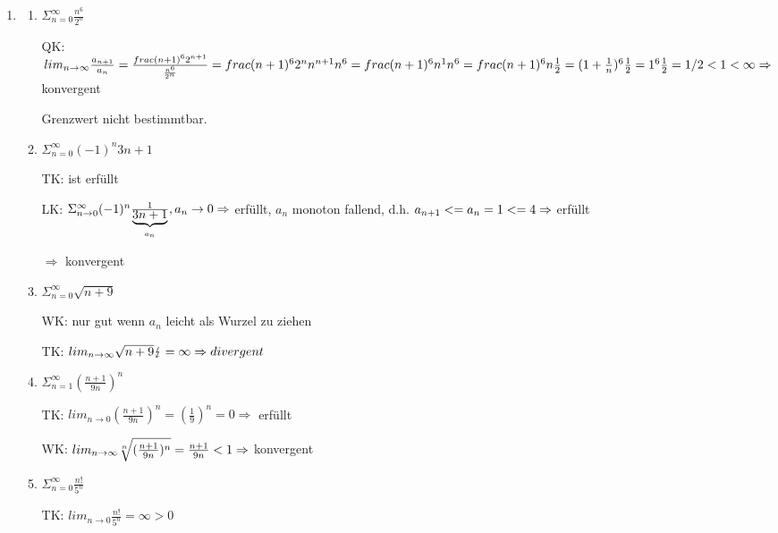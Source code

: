 \documentclass[12pt,a4paper]{scrreprt}
\begin{document}
\begin{enumerate}
\item 
\begin{enumerate}
\item $\Sigma_{n=0}^{\infty} \frac{n^6}{2^n}$

QK: $lim_{n \rightarrow \infty} \frac{a_{n+1}}{a_n} \\
= \frac{ frac{(n+1)^6}{2^{n+1}} }{ \frac{n^6}{2^n} } \\
= frac{ (n+1)^6 2^n }{ n^{n+1} n^6 } \\
= frac{ (n+1)^6 }{ n^{1} n^6 } \\
= frac{(n+1)^6}{n} \frac{1}{2} \\
= (1 + \frac{1}{n})^6 \frac{1}{2} \\
= 1^6 \frac{1}{2} = 1/2 < 1 < \infty \Rightarrow$ konvergent

Grenzwert nicht bestimmtbar.

\item $\Sigma_{n=0}^{\infty} {(-1)^n}{3n+1}$

TK: ist erfüllt

LK: $\Sigma_{n \rightarrow 0}^{\infty} (-1)^n \frac{1}{\underbrace{3n+1}_{a_n}} , a_n \\
\rightarrow 0 \Rightarrow$ erfüllt, $a_n$ monoton fallend, d.h. $a_{n+1} <= a_n = 1 <= 4 \\
\Rightarrow $ erfüllt

$\Rightarrow$ konvergent

\item $\Sigma_{n=0}^{\infty} \sqrt{n+9}$

WK: nur gut wenn $a_n$ leicht als Wurzel zu ziehen

TK: $lim_{n \rightarrow \infty} \sqrt{n+9} \lightning = \infty \\
\Rightarrow divergent$

\item $\Sigma_{n=1}^{\infty} (\frac{n+1}{9n})^n$

TK: $lim_{n \rightarrow 0} (\frac{n+1}{9n})^n = (\frac{1}{9})^n = 0 \Rightarrow$ erfüllt

WK: $lim_{n \rightarrow \infty} \sqrt[n]{(\frac{n+1}{9n})^n} = \frac{n+1}{9n} < 1 \\
\Rightarrow$ konvergent

\item $\Sigma_{n=0}^{\infty} \frac{n!}{5^n}$

TK: $lim_{n \rightarrow 0} \frac{n!}{5^n} = \infty > 0 $


\end{enumerate}
\end{enumerate}
\end{document}

